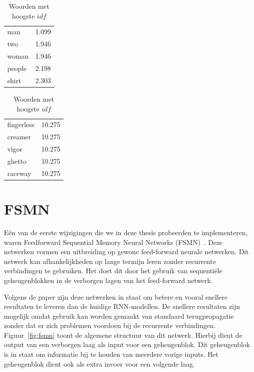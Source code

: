 \begin{table}[!htb]
	\begin{minipage}{.5\linewidth}
		\centering
		\begin{tabular}{ll}
    man    & 1.099 \\
    two    & 1.946 \\
    woman  & 1.946 \\
    people & 2.198 \\
    shirt  & 2.303 \\
		\end{tabular}
		\caption{Woorden met laagste $idf$}
		\label{tbl:idf-laag}
	\end{minipage}%
	\begin{minipage}{.5\linewidth}
		\centering
		
		\begin{tabular}{ll}
	fingerless & 10.275\\
	creamer& 10.275\\
	vigor& 10.275\\
	ghetto& 10.275\\
	raceway& 10.275\\
		\end{tabular}
		\caption{Woorden met hoogste $idf$}
		\label{tbl:idf-hoog}
	\end{minipage} 
\end{table}


\section{FSMN}
E\'en van de eerste wijzigingen die we in deze thesis probeerden te implementeren, waren Feedforward Sequential Memory Neural Networks (FSMN)~\cite{Zhang}. Deze netwerken vormen een uitbreiding op gewone feed-forward neurale netwerken. Dit netwerk kan afhankelijkheden op lange termijn leren zonder recurrente verbindingen te gebruiken. Het doet dit door het gebruik van sequenti\"ele geheugenblokken in de verborgen lagen van het feed-forward netwerk. 

Volgens de paper zijn deze netwerken in staat om betere en vooral snellere resultaten te leveren dan de huidige RNN-modellen. De snellere resultaten zijn mogelijk omdat gebruik kan worden gemaakt van standaard terugpropagatie zonder dat er zich problemen voordoen bij de recurrente verbindingen. Figuur~\ref{fig:fsmn} toont de  algemene structuur van dit netwerk. Hierbij dient de output van een verborgen laag als input voor een geheugenblok. Dit geheugenblok is in staat om informatie bij te houden van meerdere vorige inputs. Het geheugenblok dient ook als extra invoer voor een volgende laag.

